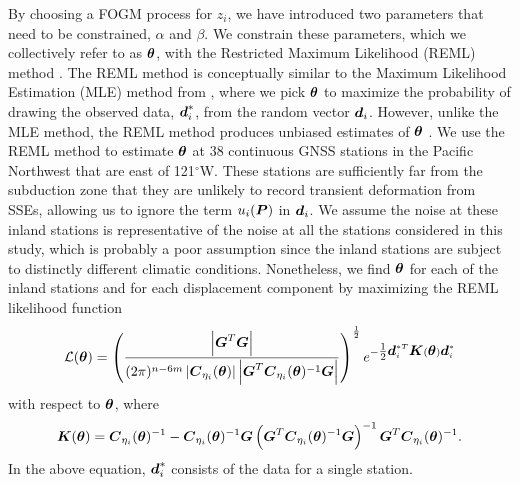 \documentclass[extra,mreferee]{gji}
\begin{document}
By choosing a FOGM process for $z_i$, we have introduced two
parameters that need to be constrained, $\alpha$ and $\beta$. We
constrain these parameters, which we collectively refer to as
$\mitbf{\theta}$, with the Restricted Maximum Likelihood (REML) method
\citep{Harville1974}. The REML method is conceptually similar to the
Maximum Likelihood Estimation (MLE) method from \citet{Langbein1997},
where we pick $\mitbf{\theta}$ to maximize the probability of drawing
the observed data, $\mitbf{d}_i^*$, from the random vector
$\mitbf{d}_i$. However, unlike the MLE method, the REML method
produces unbiased estimates of $\mitbf{\theta}$ \citep[sec.
2.6]{Cressie1992}. We use the REML method to estimate $\mitbf{\theta}$
at 38 continuous GNSS stations in the Pacific Northwest that are east
of 121$^\circ$W. These stations are sufficiently far from the
subduction zone that they are unlikely to record transient deformation
from SSEs, allowing us to ignore the term $u_i(\points)$ in
$\mitbf{d}_i$. We assume the noise at these inland stations is
representative of the noise at all the stations considered in this
study, which is probably a poor assumption since the inland stations
are subject to distinctly different climatic conditions. Nonetheless,
we find $\mitbf{\theta}$ for each of the inland stations and for each
displacement component by maximizing the REML likelihood function
\begin{equation}\label{eq:REMLNoise}
\mathcal{L}(\mitbf{\theta}) = \left(\frac{\left|\G^T\G\right|}{(2\pi)^{n-6m} 
                                    \left| \mitbf{C}_{\eta_i}(\mitbf{\theta}) \right| 
                                    \left| \G^T\mitbf{C}_{\eta_i}(\mitbf{\theta})^{-1}\G \right|}\right)^{\frac{1}{2}} 
                              e^{-\tfrac{1}{2}\data_i^{*T}\mitbf{K}(\mitbf{\theta})\data_i^*}
\end{equation}
with respect to $\mitbf{\theta}$, where
\begin{equation}
\mitbf{K}(\mitbf{\theta}) = \mitbf{C}_{\eta_i}(\mitbf{\theta})^{-1} - 
                            \mitbf{C}_{\eta_i}(\mitbf{\theta})^{-1}\G
                            \left(\G^T\mitbf{C}_{\eta_i}(\mitbf{\theta})^{-1}\G\right)^{-1}
                            \G^T\mitbf{C}_{\eta_i}(\mitbf{\theta})^{-1}.
\end{equation}
In the above equation, $\data^*_i$ consists of the data for a single station.

\end{document}
